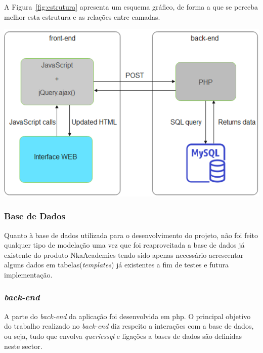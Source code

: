 A Figura~\ref{fig:estrutura} apresenta um esquema gráfico, de forma a que se perceba melhor esta estrutura e as relações entre camadas.

\begin{center}
        \includegraphics[width=\textwidth,height=\textheight,keepaspectratio]{images/estrutura.png}
        \label{fig:estrutura}
\end{center}

\subsubsection{Base de Dados}

Quanto à base de dados utilizada para o desenvolvimento do projeto, não foi feito qualquer tipo de modelação uma vez que foi reaproveitada a base de dados já existente do produto NkaAcademies tendo sido apenas necessário acrescentar alguns dados em tabelas(\textit{templates}) já existentes a fim de testes e futura implementação.


\subsubsection{\textit{back-end}}

A parte do \textit{back-end} da aplicação foi desenvolvida em \acrshort{php}. O principal objetivo do trabalho realizado no \textit{back-end} diz respeito a interações com a base de dados, ou seja, tudo que envolva \textit{queries\acrshort{sql}} e ligações a bases de dados são definidas neste sector.

